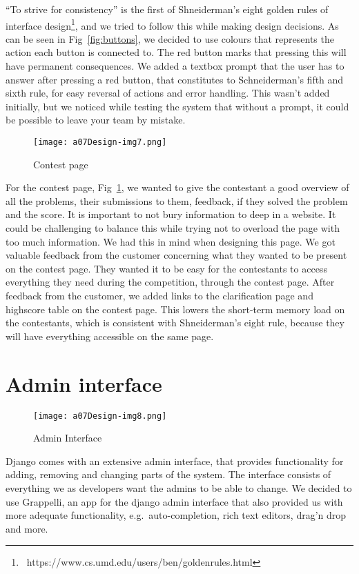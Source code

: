 ``To strive for consistency'' is the
first of Shneiderman's eight golden rules of interface
design\footnote{\ https://www.cs.umd.edu/users/ben/goldenrules.html},
and we tried to follow this while making design decisions. As can be
seen in Fig~\ref{fig:buttons}, we decided to use colours that represents the action
each button is connected to. The red button marks that pressing this
will have permanent consequences. We added a textbox prompt that the
user has to answer after pressing a red button, that constitutes to
Schneiderman's fifth and sixth rule, for easy reversal
of actions and error handling. This wasn't added
initially, but we noticed while testing the system that without a
prompt, it could be possible to leave your team by mistake.
 
\begin{figure}[h!]
	\texttt{[image: a07Design-img7.png]} 
	\caption{Contest page}
	\label{fig:contestPage}
\end{figure}

For the contest page, Fig~\ref{fig:contestPage}, we wanted to give the contestant a good
overview of all the problems, their submissions to them, feedback,
if they solved the problem and the score. It is important to not bury
information to deep in a website. It could be challenging to balance
this while trying not to overload the page with too much information.
We had this in mind when designing this page. We got valuable feedback
from the customer concerning what they wanted to be present on the
contest page. They wanted it to be easy for the contestants to access
everything they need during the competition, through the contest page.
After feedback from the customer, we added links to the clarification
page and highscore table on the contest page. This lowers the
short-term memory load on the contestants, which is consistent with
Shneiderman's eight rule, because they will have
everything accessible on the same page.


\section{Admin interface}

 \begin{figure}[h!]
	\texttt{[image: a07Design-img8.png]} 
	\caption{Admin Interface}
	\label{fig:adminInterface}
\end{figure}

Django comes with an
extensive admin interface, that provides functionality for adding,
removing and changing parts of the system. The interface consists
of everything we as developers want the admins to be able to change.
We decided to use
Grappelli, an app for the django admin interface that also provided us
with more adequate functionality, e.g.\ auto-completion, rich text
editors, drag'n drop and more.


